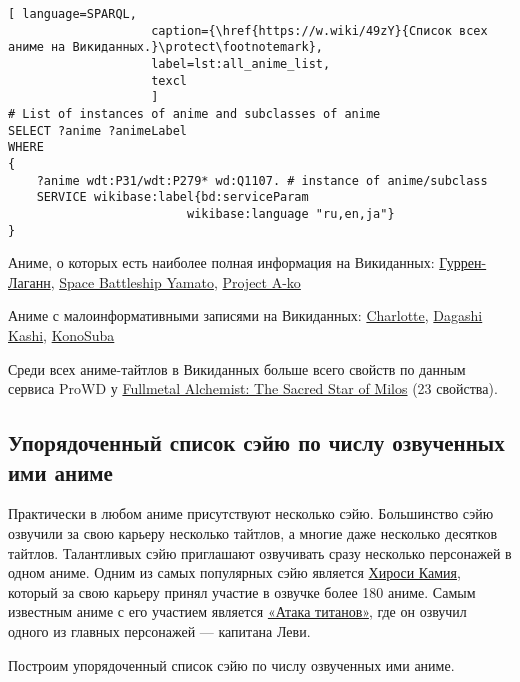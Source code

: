 \begin{lstlisting}[ language=SPARQL, 
                    caption={\href{https://w.wiki/49zY}{Список всех аниме на Викиданных.}\protect\footnotemark},
                    label=lst:all_anime_list,
                    texcl 
                    ]
# List of instances of anime and subclasses of anime
SELECT ?anime ?animeLabel
WHERE
{
    ?anime wdt:P31/wdt:P279* wd:Q1107. # instance of anime/subclass
    SERVICE wikibase:label{bd:serviceParam
					     wikibase:language "ru,en,ja"}
}
\end{lstlisting}%

Аниме, о которых есть наиболее полная информация на Викиданных: \href{https://www.wikidata.org/wiki/Q4277}{Гуррен-Лаганн}, \href{https://www.wikidata.org/wiki/Q4292}{Space Battleship Yamato}, \href{https://www.wikidata.org/wiki/Q4316}{Project A-ko}

Аниме с малоинформативными записями на Викиданных: \href{https://www.wikidata.org/wiki/Q18692527}{Charlotte}, \href{https://www.wikidata.org/wiki/Q20043638}{Dagashi Kashi}, \href{https://www.wikidata.org/wiki/Q19750843}{KonoSuba}

Среди всех аниме-тайтлов в Викиданных больше всего свойств по данным сервиса ProWD у \href{https://www.wikidata.org/wiki/Q1004318}{Fullmetal Alchemist: The Sacred Star of Milos} (23 свойства).

\subsection{Упорядоченный список сэйю по числу озвученных ими аниме}

Практически в любом аниме присутствуют несколько сэйю. Большинство сэйю озвучили за свою карьеру несколько тайтлов, а многие даже несколько десятков тайтлов. Талантливых сэйю приглашают озвучивать сразу несколько персонажей в одном аниме. Одним из самых популярных сэйю является \href{https://clck.ru/YSCoP}{Хироси Камия}, который за свою карьеру принял участие в озвучке более 180 аниме. Самым известным аниме с его участием является \href{https://clck.ru/YSCrG}{«Атака титанов»}, где он озвучил одного из главных персонажей — капитана Леви.

Построим упорядоченный список сэйю по числу озвученных ими аниме. 

